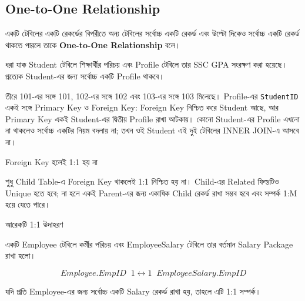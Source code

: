 
\subsection{One-to-One Relationship}

\begin{definitionbox}{}

একটি টেবিলের একটি রেকর্ডের বিপরীতে অন্য টেবিলের সর্বোচ্চ
একটি রেকর্ড এবং উল্টো দিকেও সর্বোচ্চ একটি রেকর্ড থাকতে পারলে
তাকে \textbf{One-to-One Relationship} বলে।

\end{definitionbox}


ধরা যাক Student টেবিলে শিক্ষার্থীর পরিচয় এবং Profile টেবিলে
তার SSC GPA সংরক্ষণ করা হয়েছে। প্রত্যেক Student-এর জন্য সর্বোচ্চ
একটি Profile থাকবে।



তীরে 101-এর সঙ্গে 101, 102-এর সঙ্গে 102 এবং 103-এর সঙ্গে 103 মিলেছে।
Profile-এর \texttt{StudentID} একই সঙ্গে Primary Key ও Foreign Key:
Foreign Key নিশ্চিত করে Student আছে, আর Primary Key একই Student-এর
দ্বিতীয় Profile রাখা আটকায়। কোনো Student-এর Profile এখনো না থাকলেও
সর্বোচ্চ একটির নিয়ম বদলায় না; তখন ওই Student এই দুই টেবিলের INNER JOIN-এ আসবে না।

\begin{mistakebox}{Foreign Key হলেই 1:1 হয় না}

শুধু Child Table-এ Foreign Key থাকলেই 1:1 নিশ্চিত হয় না। Child-এর Related ফিল্ডটিও Unique হতে হবে; না হলে একই Parent-এর
জন্য একাধিক Child রেকর্ড রাখা সম্ভব হবে এবং সম্পর্ক 1:M
হয়ে যেতে পারে।

\end{mistakebox}


\begin{examplebox}{আরেকটি 1:1 উদাহরণ}

একটি Employee টেবিলে কর্মীর পরিচয় এবং EmployeeSalary টেবিলে
তার বর্তমান Salary Package রাখা হলো।

\[
Employee.EmpID
\;\;1
\longleftrightarrow
1\;\;
EmployeeSalary.EmpID
\]

যদি প্রতি Employee-এর জন্য সর্বোচ্চ একটি Salary রেকর্ড রাখা হয়,
তাহলে এটি 1:1 সম্পর্ক।

\end{examplebox}



